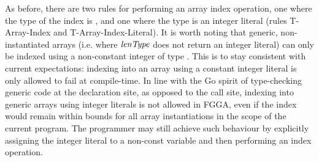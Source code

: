 As before, there are two rules for performing an array index operation, one
where the type of the index is , and one where the type is an integer
literal (rules T-Array-Index and T-Array-Index-Literal). It is worth noting that
generic, non-instantiated arrays (i.e. where $\mathit{lenType}$ does not return an
integer literal) can only be indexed using a non-constant integer of type
. This is to stay consistent with current expectations: indexing into an
array using a constant integer literal is only allowed to fail at compile-time.
In line with the Go spirit of type-checking generic code at the declaration
site, as opposed to the call site, indexing into generic arrays using integer
literals is not allowed in FGGA, even if the index would remain within bounds
for all array instantiations in the scope of the current program. The programmer
may still achieve such behaviour by explicitly assigning the integer literal to
a non-const  variable and then performing an index operation.



